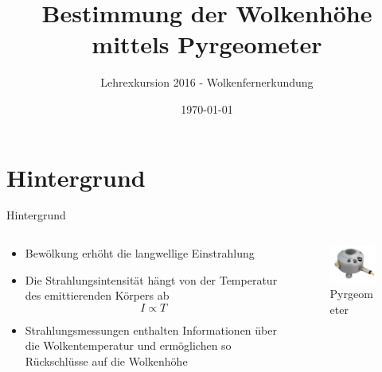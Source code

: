 \documentclass{beamer}
\title{Bestimmung der Wolkenhöhe mittels Pyrgeometer}
\author{Lehrexkursion 2016 - Wolkenfernerkundung}
\date{\today}
\begin{document}
\begin{frame}
\titlepage
\end{frame}

\section{Hintergrund}
\begin{frame}{Hintergrund}
\begin{columns}
\begin{column}{0.6\textwidth}
\begin{itemize}
  \vfill\item Bewölkung erhöht die langwellige Einstrahlung
  \vfill\item Die Strahlungsintensität hängt von der Temperatur des
      emittierenden Körpers ab \[ I \propto T\]
  \vfill\item Strahlungsmessungen enthalten Informationen über die
      Wolkentemperatur und ermöglichen so Rückschlüsse auf die Wolkenhöhe
  \vfill
\end{itemize}
\end{column}

\begin{column}{0.4\textwidth}
\begin{figure}[ht]
    \centering
    \includegraphics[width=1\textwidth]{figures/pyrgeometer.png}
    \caption{Pyrgeometer}
    \label{fig:pyrgeometer}
\end{figure}
\end{column}
\end{columns}
\end{frame}
\end{document}
